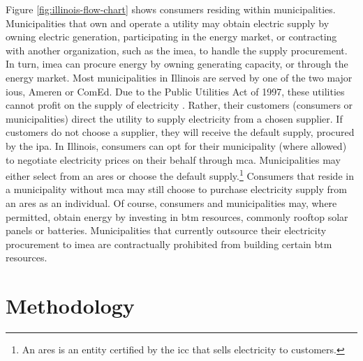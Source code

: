 Figure \ref{fig:illinois-flow-chart} shows consumers residing within
municipalities. Municipalities that own and operate a utility may obtain
electric supply by owning electric generation, participating in the energy
market, or contracting with another organization, such as the \ac{imea}, to
handle the supply procurement. In turn, \ac{imea} can procure energy by owning
generating capacity, or through the energy market. Most municipalities in
Illinois are served by one of the two major \acp{iou}, Ameren or ComEd. Due to
the Public Utilities Act of 1997, these utilities cannot profit on the supply of
electricity \cite{illinois_90th_general_assembly_electric_1997}. Rather, their
customers (consumers or municipalities) direct the utility to supply electricity
from a chosen supplier. If customers do not choose a supplier, they will receive
the default supply, procured by the \ac{ipa}. In Illinois, consumers can opt for
their municipality (where allowed) to negotiate electricity prices on their
behalf through \ac{mca}. Municipalities may either select from an \ac{ares} or
choose the default supply.\footnote{An \ac{ares} is an entity certified by the
\ac{icc} that sells electricity to customers.} Consumers that reside in a
municipality without \ac{mca} may still choose to purchase electricity supply
from an \ac{ares} as an individual. Of course, consumers and municipalities may,
where permitted, obtain energy by investing in \ac{btm} resources, commonly
rooftop solar panels or batteries. Municipalities that currently outsource their
electricity procurement to \ac{imea} are contractually prohibited from building
certain \ac{btm} resources.
 

\section{Methodology}
\label{section:interview-methods}

